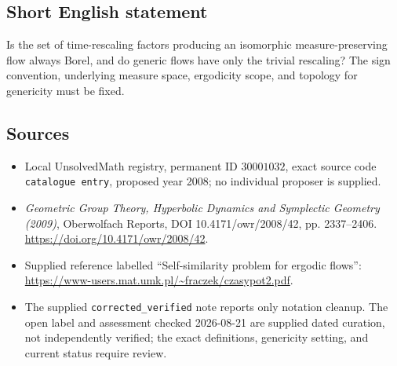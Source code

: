 \documentclass[11pt]{article}
\begin{document}
\subsection{Short English statement}
Is the set of time-rescaling factors producing an isomorphic measure-preserving flow always Borel, and do generic flows have only the trivial rescaling? The sign convention, underlying measure space, ergodicity scope, and topology for genericity must be fixed.
\subsection{Sources}
\begin{itemize}
\item Local UnsolvedMath registry, permanent ID \(30001032\), exact source code \texttt{catalogue entry}, proposed year 2008; no individual proposer is supplied.
\item \emph{Geometric Group Theory, Hyperbolic Dynamics and Symplectic Geometry (2009)}, Oberwolfach Reports, DOI 10.4171/owr/2008/42, pp. 2337--2406. \url{https://doi.org/10.4171/owr/2008/42}.
\item Supplied reference labelled ``Self-similarity problem for ergodic flows'': \url{https://www-users.mat.umk.pl/~fraczek/czasypot2.pdf}.
\item The supplied \texttt{corrected\_verified} note reports only notation cleanup. The open label and assessment checked 2026-08-21 are supplied dated curation, not independently verified; the exact definitions, genericity setting, and current status require review.
\end{itemize}
\end{document}
